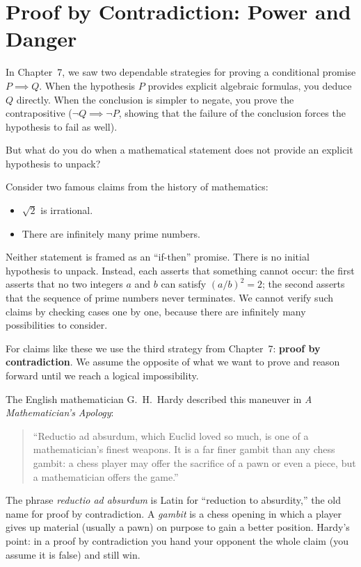 \section{Proof by Contradiction: Power and Danger}
\chapterline

In Chapter~7, we saw two dependable strategies for proving a conditional promise $P \implies Q$. When the hypothesis $P$ provides explicit algebraic formulas, you deduce $Q$ directly. When the conclusion is simpler to negate, you prove the contrapositive ($\neg Q \implies \neg P$, showing that the failure of the conclusion forces the hypothesis to fail as well).

But what do you do when a mathematical statement does not provide an explicit hypothesis to unpack?

Consider two famous claims from the history of mathematics:
\begin{itemize}
\item $\sqrt{2}$ is irrational.
\item There are infinitely many prime numbers.
\end{itemize}
Neither statement is framed as an ``if-then'' promise. There is no initial hypothesis to unpack. Instead, each asserts that something cannot occur: the first asserts that no two integers $a$ and $b$ can satisfy $(a/b)^2 = 2$; the second asserts that the sequence of prime numbers never terminates. We cannot verify such claims by checking cases one by one, because there are infinitely many possibilities to consider.

For claims like these we use the third strategy from Chapter~7: \textbf{proof by contradiction}. We assume the opposite of what we want to prove and reason forward until we reach a logical impossibility.

The English mathematician G.~H.~Hardy described this maneuver in \emph{A Mathematician's Apology}:
\begin{quote}
``Reductio ad absurdum, which Euclid loved so much, is one of a mathematician's finest weapons. It is a far finer gambit than any chess gambit: a chess player may offer the sacrifice of a pawn or even a piece, but a mathematician offers the game.''
\end{quote}
The phrase \emph{reductio ad absurdum} is Latin for ``reduction to absurdity,'' the old name for proof by contradiction. A \emph{gambit} is a chess opening in which a player gives up material (usually a pawn) on purpose to gain a better position. Hardy's point: in a proof by contradiction you hand your opponent the whole claim (you assume it is false) and still win.

